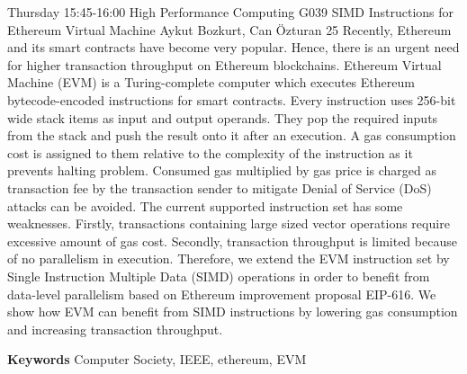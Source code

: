 
    \begin{abstract_basarim}
    {Thursday 15:45-16:00}
    {High Performance Computing}
    {G039}
    {SIMD Instructions for Ethereum Virtual Machine}
    {%
    Aykut Bozkurt, Can Özturan}
    {%
    }
    {%
    25}
    Recently, Ethereum and its smart contracts have become very popular. Hence, there is an urgent need for higher transaction throughput on Ethereum blockchains. Ethereum Virtual Machine (EVM) is a Turing-complete computer which executes Ethereum bytecode-encoded instructions for smart contracts. Every instruction uses 256-bit wide stack items as input and output operands. They pop the required inputs from the stack and push the result onto it after an execution. A gas consumption cost is assigned to them relative to the complexity of the instruction as it prevents halting problem. Consumed gas multiplied by gas price is charged as transaction fee by the transaction sender to mitigate Denial of Service (DoS) attacks can be avoided. The current supported instruction set has some weaknesses. Firstly, transactions containing large sized vector operations require excessive amount of gas cost. Secondly, transaction throughput is limited because of no parallelism in execution. Therefore, we extend the EVM instruction set by Single Instruction Multiple Data (SIMD) operations in order to benefit from data-level parallelism based on Ethereum improvement proposal EIP-616. We show how EVM can benefit from SIMD instructions by lowering gas consumption and increasing transaction throughput. 
    
        \textbf{Keywords} \newline{}Computer Society, IEEE, ethereum, EVM
    \end{abstract_basarim}
    